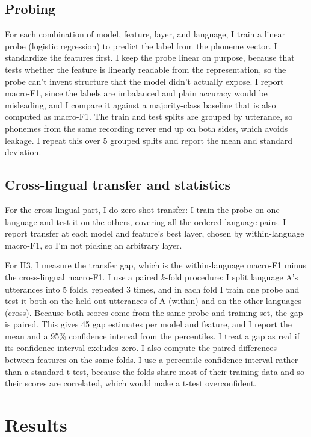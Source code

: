 \documentclass[twoside,11pt]{article}
\begin{document}
\subsection{Probing}
For each combination of model, feature, layer, and language, I train a linear
probe (logistic regression) to predict the label from the phoneme vector. I
standardize the features first. I keep the probe linear on purpose, because that
tests whether the feature is linearly readable from the representation, so the
probe can't invent structure that the model didn't actually expose. I report
macro-F1, since the labels are imbalanced and plain accuracy would be misleading,
and I compare it against a majority-class baseline that is also computed as
macro-F1. The train and test splits are grouped by utterance, so phonemes from the
same recording never end up on both sides, which avoids leakage. I repeat this
over 5 grouped splits and report the mean and standard deviation.

\subsection{Cross-lingual transfer and statistics}
For the cross-lingual part, I do zero-shot transfer: I train the probe on one
language and test it on the others, covering all the ordered language pairs. I
report transfer at each model and feature's best layer, chosen by within-language
macro-F1, so I'm not picking an arbitrary layer.

For H3, I measure the transfer gap, which is the within-language macro-F1 minus the
cross-lingual macro-F1. I use a paired $k$-fold procedure: I split language A's
utterances into 5 folds, repeated 3 times, and in each fold I train one probe and
test it both on the held-out utterances of A (within) and on the other languages
(cross). Because both scores come from the same probe and training set, the gap is
paired. This gives 45 gap estimates per model and feature, and I report the mean
and a 95\% confidence interval from the percentiles. I treat a gap as real if its
confidence interval excludes zero. I also compute the paired differences between
features on the same folds. I use a percentile confidence interval rather than a
standard t-test, because the folds share most of their training data and so their
scores are correlated, which would make a t-test overconfident.

\section{Results}
\end{document}
